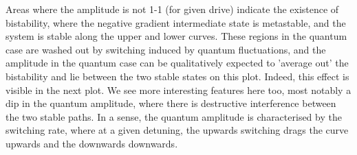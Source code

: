 Areas where the amplitude is not 1-1 (for given drive) indicate the existence of bistability, where the negative gradient intermediate state is metastable, and the system is stable along the upper and lower curves. These regions in the quantum case are washed out by switching induced by quantum fluctuations, and the amplitude in the quantum case can be qualitatively expected to 'average out' the bistability and lie between the two stable states on this plot. Indeed, this effect is visible in the next plot. We see more interesting features here too, most notably a dip in the quantum amplitude, where there is destructive interference between the two stable paths. In a sense, the quantum amplitude is characterised by the switching rate, where at a given detuning, the upwards switching drags the curve upwards and the downwards downwards.  
